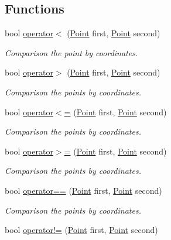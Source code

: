 \subsection*{Functions}
\begin{DoxyCompactItemize}
\item 
bool \mbox{\hyperlink{namespacetdp_aa76700935906dbb491a443a4662d758f}{operator$<$}} (\mbox{\hyperlink{structtdp_1_1_point}{Point}} first, \mbox{\hyperlink{structtdp_1_1_point}{Point}} second)
\begin{DoxyCompactList}\small\item\em Comparison the point by coordinates. \end{DoxyCompactList}\item 
bool \mbox{\hyperlink{namespacetdp_a948b73cf0c6d99e08e145094d83d8e97}{operator$>$}} (\mbox{\hyperlink{structtdp_1_1_point}{Point}} first, \mbox{\hyperlink{structtdp_1_1_point}{Point}} second)
\begin{DoxyCompactList}\small\item\em Comparison the points by coordinates. \end{DoxyCompactList}\item 
bool \mbox{\hyperlink{namespacetdp_a3d677102635fab3ad0088b88378e5b48}{operator$<$=}} (\mbox{\hyperlink{structtdp_1_1_point}{Point}} first, \mbox{\hyperlink{structtdp_1_1_point}{Point}} second)
\begin{DoxyCompactList}\small\item\em Comparison the points by coordinates. \end{DoxyCompactList}\item 
bool \mbox{\hyperlink{namespacetdp_a88169ae92b50b53e80d23d8df9d263d1}{operator$>$=}} (\mbox{\hyperlink{structtdp_1_1_point}{Point}} first, \mbox{\hyperlink{structtdp_1_1_point}{Point}} second)
\begin{DoxyCompactList}\small\item\em Comparison the points by coordinates. \end{DoxyCompactList}\item 
bool \mbox{\hyperlink{namespacetdp_ac28871640d9ee5c6f37f75be07b6d187}{operator==}} (\mbox{\hyperlink{structtdp_1_1_point}{Point}} first, \mbox{\hyperlink{structtdp_1_1_point}{Point}} second)
\begin{DoxyCompactList}\small\item\em Comparison the points by coordinates. \end{DoxyCompactList}\item 
bool \mbox{\hyperlink{namespacetdp_ab1602cb8c233d6ab4a5fa0e12dd219f1}{operator!=}} (\mbox{\hyperlink{structtdp_1_1_point}{Point}} first, \mbox{\hyperlink{structtdp_1_1_point}{Point}} second)

\end{DoxyCompactItemize}
